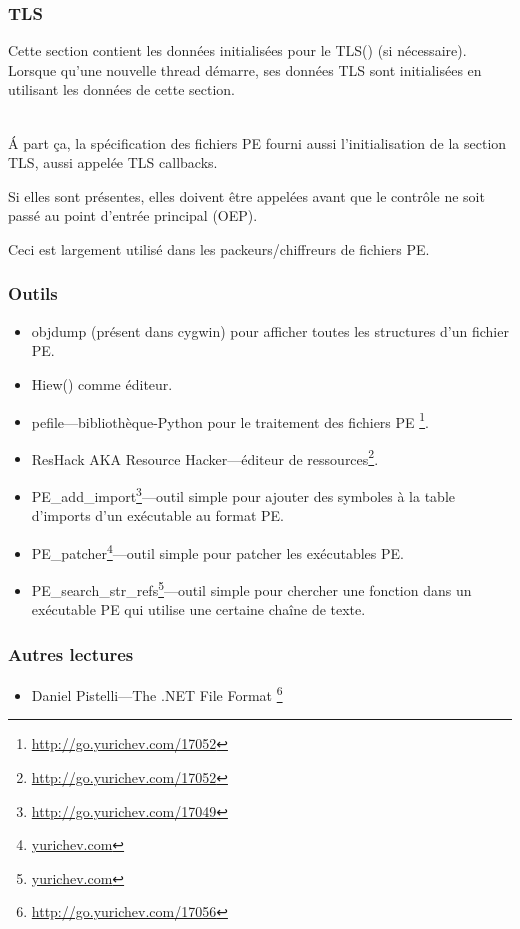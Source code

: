 \subsubsection{TLS}

Cette section contient les données initialisées pour le \ac{TLS}() (si
nécessaire). Lorsque qu'une nouvelle thread démarre, ses données \ac{TLS} sont initialisées
en utilisant les données de cette section. \\
\\

Á part ça, la spécification des fichiers PE fourni aussi l'initialisation de la section
\ac{TLS}, aussi appelée TLS callbacks.

Si elles sont présentes, elles doivent être appelées avant que le contrôle ne soit
passé au point d'entrée principal (\ac{OEP}).

Ceci est largement utilisé dans les packeurs/chiffreurs de fichiers PE.

\subsubsection{Outils}

\label{ResHack}

\begin{itemize}
\item objdump (présent dans cygwin) pour afficher toutes les structures d'un fichier PE.

\item Hiew() comme éditeur.

\item pefile---bibliothèque-Python pour le traitement des fichiers PE \footnote{\url{http://go.yurichev.com/17052}}.

\item ResHack \acs{AKA} Resource Hacker---éditeur de ressources\footnote{\url{http://go.yurichev.com/17052}}.

\item PE\_add\_import\footnote{\url{http://go.yurichev.com/17049}}---outil simple
pour ajouter des symboles à la table d'imports d'un exécutable au format PE.

\item PE\_patcher\footnote{\href{http://go.yurichev.com/17054}{yurichev.com}}---outil
simple pour patcher les exécutables PE.

\item PE\_search\_str\_refs\footnote{\href{http://go.yurichev.com/17055}{yurichev.com}}---outil
simple pour chercher une fonction dans un exécutable PE qui utilise une certaine chaîne de texte.
\end{itemize}

\subsubsection{Autres lectures}

\begin{itemize}
\item Daniel Pistelli---The .NET File Format \footnote{\url{http://go.yurichev.com/17056}}
\end{itemize}

